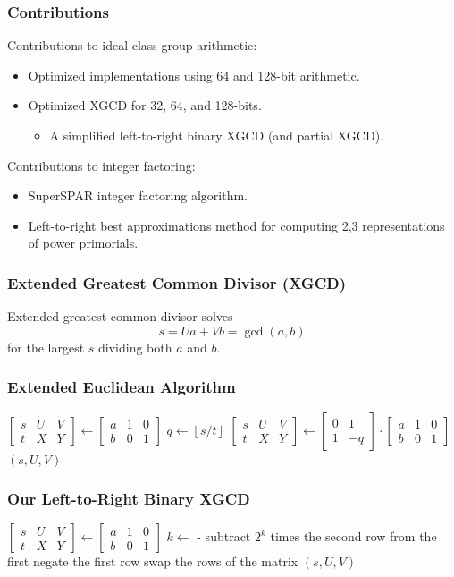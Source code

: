 \documentclass{beamer}
\newcommand{\ZZgez}{\mathbb{Z}_{\ge 0}}
\newcommand{\matrixtt}[4]{\left[ \begin{array}{rr} #1 & #2 \\ #3 & #4 \end{array} \right]}
\newcommand{\matrixThreeTwo}[6]{\left[ \begin{array}{rrr} #1 & #2 & #3 \\ #4 & #5 & #6 \end{array} \right]}
\newcommand{\floor}[1]{\left\lfloor #1 \right\rfloor}
\begin{document}
\begin{frame}
\frametitle{Contributions}
Contributions to ideal class group arithmetic:
\begin{itemize} %
\item Optimized implementations using 64 and 128-bit arithmetic.
\item Optimized XGCD for 32, 64, and 128-bits.
	\begin{itemize}
	\item A simplified left-to-right binary XGCD (and partial XGCD).
	\end{itemize}
\end{itemize}

\bigskip
Contributions to integer factoring:
\begin{itemize}
\item SuperSPAR integer factoring algorithm.
\item Left-to-right best approximations method for computing 2,3 representations of power primorials.
\end{itemize}
\end{frame}

\begin{frame}
\frametitle{Extended Greatest Common Divisor (XGCD)}
Extended greatest common divisor solves
\[
	s = Ua + Vb = \gcd(a, b)
\]
for the largest $s$ dividing both $a$ and $b$.
\end{frame}

\begin{frame}
\frametitle{Extended Euclidean Algorithm}
\begin{algorithmic}[1]
 \Comment{$a, b \in \ZZgez$}
\State $\matrixThreeTwo{s}{U}{V}{t}{X}{Y} \gets \matrixThreeTwo{a}{1}{0}{b}{0}{1}$
	\State $q \gets \floor{s/t}$
	\State $\matrixThreeTwo{s}{U}{V}{t}{X}{Y} \gets \matrixtt{0}{1}{1}{-q} \cdot \matrixThreeTwo{a}{1}{0}{b}{0}{1}$
\EndWhile
\State \Return $(s, U, V)$
\EndProcedure
\end{algorithmic}
\end{frame}


\begin{frame}
\frametitle{Our Left-to-Right Binary XGCD}
\begin{algorithmic}[1]
 \Comment{$a, b \in \ZZgez$}
\State $\matrixThreeTwo{s}{U}{V}{t}{X}{Y} \gets \matrixThreeTwo{a}{1}{0}{b}{0}{1}$
	\State $k \gets $  - 
	\State subtract $2^k$ times the second row from the first
	 negate the first row \EndIf
	 swap the rows of the matrix \EndIf
\EndWhile
\State \Return $(s, U, V)$
\EndProcedure
\end{algorithmic}
\end{frame}
\end{document}
